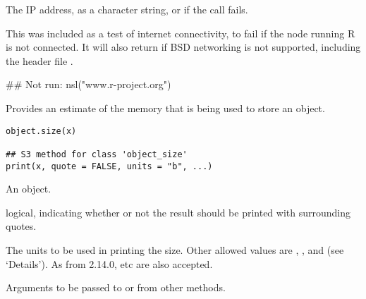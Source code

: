 %
\begin{Value}
The IP address, as a character string, or  if the call fails.
\end{Value}
%
\begin{Note}\relax
This was included as a test of internet connectivity, to fail if
the node running R is not connected.  It will also return 
if BSD networking is not supported, including the header file
.
\end{Note}
%
\begin{Examples}
\begin{ExampleCode}
## Not run: nsl("www.r-project.org")
\end{ExampleCode}
\end{Examples}
%
\begin{Description}\relax
Provides an estimate of the memory that is being used to store an \R{} object.
\end{Description}
%
\begin{Usage}
\begin{verbatim}
object.size(x)

## S3 method for class 'object_size'
print(x, quote = FALSE, units = "b", ...)
\end{verbatim}
\end{Usage}
%
\begin{Arguments}
\begin{ldescription}
\item[\code{x}] An \R{} object.
\item[\code{quote}] logical, indicating whether or not the result should be
printed with surrounding quotes.
\item[\code{units}] The units to be used in printing the size.  Other allowed
values are , ,  and 
(see `Details').
As from \R{} 2.14.0,  etc are also accepted.
\item[\code{...}] Arguments to be passed to or from other methods.
\end{ldescription}
\end{Arguments}
%
